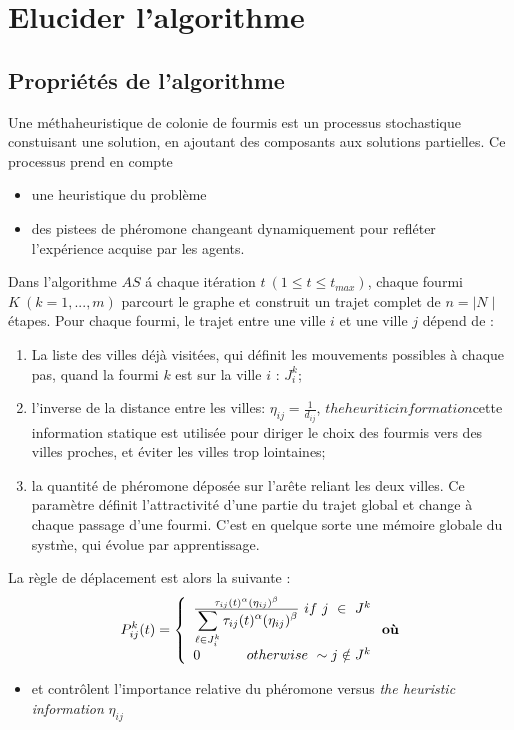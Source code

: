 
\section{Elucider l'algorithme}
\subsection{Propri\'et\'es de l'algorithme}
Une m\'ethaheuristique de colonie de fourmis est un processus stochastique constuisant une solution, en ajoutant des composants aux solutions partielles. Ce processus prend en compte
\begin{itemize}
\item une heuristique du probl\`eme
\item des pistees de ph\'eromone changeant dynamiquement pour refl\'eter l'exp\'erience acquise par les agents.
\end{itemize}

Dans l'algorithme $AS$ \'a chaque it\'eration $t\ ( 1 \leq t \leq t_{\textit{max}})$, chaque fourmi $K\ (k= 1,...,m)$ parcourt le graphe et construit un trajet complet de $n = \mid \textit{N} \mid$ \'etapes. Pour chaque fourmi, le trajet entre une ville $i$ et une ville $j$ d\'epend de :
\begin{enumerate}
\item La liste des villes d\'ej\`a visit\'ees, qui d\'efinit les mouvements possibles \`a chaque pas, quand la fourmi $ k $ est sur la ville $ i $ : $ J_i^k $;
\item l'inverse de la distance entre les villes: $ \eta_{ij} = \frac{1}{d_{ij}} $, $ the heuritic information $cette information statique est utilis\'ee pour diriger le choix des fourmis vers des villes proches, et \'eviter les villes trop lointaines;

\item la quantit\'e de ph\'eromone d\'epos\'ee sur l'ar\^ete reliant les deux villes. Ce param\`etre d\'efinit l'attractivit\'e d'une partie du trajet global et change \`a chaque passage d'une fourmi. C'est en quelque sorte une m\'emoire globale du syst\`me, qui \'evolue par apprentissage.
\end{enumerate}
La r\`egle de d\'eplacement est alors la suivante :
\begin{equation}
P_{ij}^k(t)= \left\{
\begin{array}{ll}

\frac{\tau_{ij}(t)^\alpha(\eta_{ij})^\beta}{\displaystyle\sum_{\ell\in
J_i^k}{\tau_{ij}(t)^\alpha(\eta_{ij})^\beta}}\  if\ j\ \in\ J^k\\
0 \ \hfill otherwise\ \sim j \notin  J^k 
\end{array}
\right.\textbf{o\`u}
\end{equation}
\begin{itemize}
\item \boldmath{$ \alpha $} et \boldmath{$ \beta $} contr\^olent l'importance relative du ph\'eromone versus \textit{the heuristic information} $ \eta_{ij} $\\
\end{itemize}

